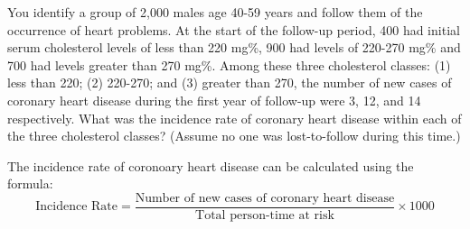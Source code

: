 \documentclass[a4paper]{exam}
\begin{document}
\begin{questions}
    \question[10]
    You identify a group of 2,000 males age 40-59 years and follow them of the occurrence of heart problems. At the start of the follow-up period, 400 had initial serum cholesterol levels of less than 220 mg\%, 900 had levels of 220-270 mg\% and 700 had levels greater than 270 mg\%. Among these three cholesterol classes: (1) less than 220; (2) 220-270; and (3) greater than 270, the number of new cases of coronary heart disease during the first year of follow-up were 3, 12, and 14 respectively. What was the incidence rate of coronary heart disease within each of the three cholesterol classes? (Assume no one was lost-to-follow during this time.)

    \begin{solution}
        The incidence rate of coronoary heart disease can be calculated using the formula:
        \begin{equation*}
            \text{Incidence Rate} = \frac{\text{Number of new cases of coronary heart disease}}{\text{Total person-time at risk}} \times 1000
        \end{equation*}
    \end{solution}


\end{questions}
\end{document}
